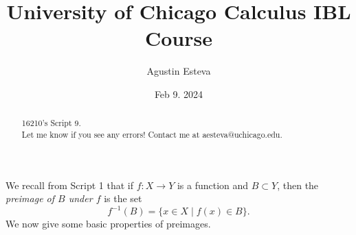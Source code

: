 \documentclass[openany, amssymb, psamsfonts]{amsart}
\title{University of Chicago Calculus IBL Course}
\author{Agustin Esteva}
\date{Feb 9. 2024}
\theoremstyle{definition}
\numberwithin{equation}{section}
\begin{document}
\begin{abstract}

16210's Script 9.\\ Let me know if you see any errors! Contact me at aesteva@uchicago.edu.


\end{abstract}

\maketitle

\tableofcontents

\setcounter{section}{9}
We recall from Script 1 that if $f \colon X \rightarrow Y$ is a function and $B \subset Y$, then the \emph{preimage of $B$ under $f$} is the set
\[
f^{-1}(B) = \{ x \in X \mid f(x) \in B \}.
\]
We now give some basic properties of preimages.
\newpage
\end{document}
